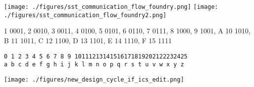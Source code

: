 \documentclass[landscape, a4paper]{article}
\begin{document}
\begin{minipage}[t]{0.2\linewidth}
\begin{betterlist}
\begin{betterlist}
\begin{betterlist}
				\texttt{[image: ./figures/sst\_communication\_flow\_foundry.png]}
				\texttt{[image: ./figures/sst\_communication\_flow\_foundry2.png]}
			\end{betterlist}
		\end{betterlist}
		\item 1 0001, 2 0010, 3 0011, 4 0100, 5 0101, 6 0110, 7 0111, 8 1000, 9 1001, A 10 1010, B 11 1011, C 12 1100, D 13 1101, E 14 1110, F 15 1111
		\fontsize{4pt}{4pt}\selectfont
		\item \begin{verbatim}
0 1 2 3 4 5 6 7 8 9 10111213141516171819202122232425
a b c d e f g h i j k l m n o p q r s t u v w x y z
\end{verbatim}

		\texttt{[image: ./figures/new\_design\_cycle\_if\_ics\_edit.png]}
	\end{betterlist}
\end{minipage}
\end{document}
